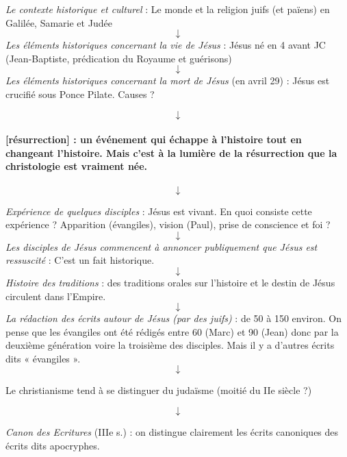  
\emph{Le contexte historique et
culturel} : Le monde et la religion juifs (et païens) en Galilée,
Samarie et Judée
$$\downarrow$$
\emph{Les éléments historiques
concernant la vie de Jésus} : Jésus né en 4 avant JC (Jean-Baptiste,
prédication du Royaume et guérisons)
$$\downarrow$$
\emph{Les éléments historiques
concernant la mort de Jésus} (en avril 29) : Jésus est crucifié sous
Ponce Pilate. Causes ?
 
$$\downarrow$$

 
\paragraph{{[}résurrection{]} : un événement qui échappe à l'histoire tout
en changeant l'histoire. Mais c'est à la lumière de la résurrection que
la christologie est vraiment
née.} 
$$\downarrow$$


 
\emph{Expérience de quelques
disciples} : Jésus est vivant. En quoi consiste cette expérience ?
Apparition (évangiles), vision (Paul), prise de conscience et foi ?
$$\downarrow$$
\emph{Les disciples de Jésus commencent à annoncer publiquement que
Jésus est ressuscité} : C'est un fait historique.
$$\downarrow$$
\emph{Histoire des traditions}
: des traditions orales sur l'histoire et le destin de Jésus circulent
dans l'Empire.
 $$\downarrow$$
\emph{La rédaction des écrits autour de Jésus (par des juifs)} : de 50 à
150 environ. On pense que les évangiles ont été rédigés entre 60 (Marc)
et 90 (Jean) donc par la deuxième génération voire la troisième des
disciples. Mais il y a d'autres écrits dits « évangiles ».
$$\downarrow$$


Le christianisme tend à se distinguer du judaïsme (moitié du IIe siècle
?)
 
$$\downarrow$$

\emph{Canon des Ecritures} (IIIe s.) : on distingue clairement les
écrits canoniques des écrits dits apocryphes.
 
 

